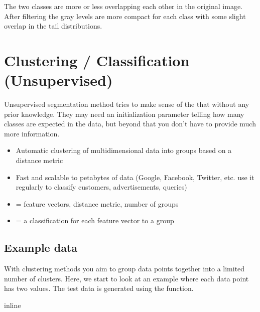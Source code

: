 \documentclass[letterpaper,10pt,english]{sphinxmanual}
\begin{document}
\noindent{}

\sphinxAtStartPar
The two classes are more or less overlapping each other in the original image. After filtering the gray levels are more compact for each class with some slight overlap in the tail distributions.


\chapter{Clustering / Classification (Unsupervised)}
\label{\detokenize{05-AdvancedSegmentation:clustering-classification-unsupervised}}
\sphinxAtStartPar
Unsupervised segmentation method tries to make sense of the that without any prior knowledge. They may need an initialization parameter telling how many classes are expected in the data, but beyond that you don’t have to provide much more information.
\begin{itemize}
\item {} 
\sphinxAtStartPar
Automatic clustering of multidimensional data into groups based on a distance metric

\item {} 
\sphinxAtStartPar
Fast and scalable to petabytes of data (Google, Facebook, Twitter, etc. use it regularly to classify customers, advertisements, queries)

\item {} 
\sphinxAtStartPar
{} = feature vectors, distance metric, number of groups

\item {} 
\sphinxAtStartPar
{} = a classification for each feature vector to a group

\end{itemize}


\section{Example data}
\label{\detokenize{05-AdvancedSegmentation:example-data}}
\sphinxAtStartPar
With clustering methods you aim to group data points together into a limited number of clusters. Here, we start to look at an example where each data point has two values. The test data is generated using the  function.

\begin{sphinxVerbatim}[commandchars=\\\{\}]
   
   
   
   
 inline
\end{sphinxVerbatim}
\end{document}
